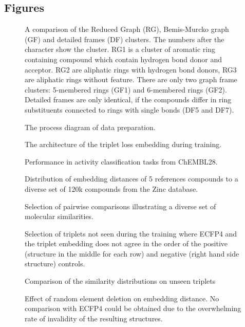 \documentclass[doublespacing]{bmcart}
\begin{document}
\begin{backmatter}




\section*{Figures}

\begin{figure}[h!]
\caption{A comparison of the Reduced Graph (RG), Bemis-Murcko graph (GF) and detailed frames (DF) clusters. The numbers after the character show the cluster. RG1 is a cluster of aromatic ring containing compound which contain hydrogen bond donor and acceptor. RG2 are aliphatic rings with hydrogen bond donors, RG3 are aliphatic rings without feature. There are only two graph frame clusters: 5-membered rings (GF1) and 6-membered rings (GF2). Detailed frames are only identical, if the compounds differ in ring substituents connected to rings with single bonds (DF5 and DF7).}
\label{fig:GF_DF_RG}
\end{figure}

\begin{figure}[h!]
\caption{The process diagram of data preparation.}
\label{fig:Process_Diagram}
\end{figure}

\begin{figure}[h!]
\caption{The architecture of the triplet loss embedding during training.}
\label{fig:triplet_arch}
\end{figure}
%
\begin{figure}[h!]
\caption{Performance in activity classification tasks from ChEMBL28.}
\label{fig:Kappa_ChEMBL}
\end{figure}

\begin{figure}[h!]
\caption{Distribution of embedding distances of 5 references compounds to a diverse set of 120k compounds from the Zinc database.}
\label{fig:References_distributions}
\end{figure}


\begin{figure}[h!]
\caption{Selection of pairwise comparisons illustrating a diverse set of molecular similarities.}
\label{fig:Similarity_study_cases}
\end{figure}

\begin{figure}[h!]
\caption{Selection of triplets not seen during the training where ECFP4 and the triplet embedding does not agree in the order of the positive (structure in the middle for each row) and negative (right hand side structure) controls.}
\label{fig:Unseen_Fails}
\end{figure}
%
\begin{figure}[h!]
\caption{Comparison of the similarity distributions on unseen triplets}
\label{fig:ECFP4_Embedding_triplets}
\end{figure}

\begin{figure}[h!]
\caption{Effect of random element deletion on embedding distance. No comparison with ECFP4 could be obtained due to the overwhelming rate of invalidity of the resulting structures.}
\label{fig:Ablations}
\end{figure}

\end{backmatter}
\end{document}
